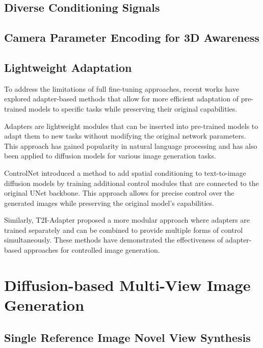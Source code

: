 \subsection{Diverse Conditioning Signals}

\subsection{Camera Parameter Encoding for 3D Awareness}

\subsection{Lightweight Adaptation}

To address the limitations of full fine-tuning approaches, recent
works have explored adapter-based methods that allow for more
efficient adaptation of pre-trained models to specific tasks while
preserving their original capabilities.

Adapters are lightweight modules that can be inserted into
pre-trained models to adapt them to new tasks without modifying the
original network parameters. This approach has gained popularity in
natural language processing and has also been applied to diffusion
models for various image generation tasks.

ControlNet \cite{controlnet} introduced a method to add spatial
conditioning to text-to-image diffusion models by training additional
control modules that are connected to the original UNet backbone.
This approach allows for precise control over the generated images
while preserving the original model's capabilities.

Similarly, T2I-Adapter \cite{t2iadapter} proposed a more modular
approach where adapters are trained separately and can be combined to
provide multiple forms of control simultaneously. These methods have
demonstrated the effectiveness of adapter-based approaches for
controlled image generation.

\section{Diffusion-based Multi-View Image
Generation}\label{sec:multi-view-diffusion}

\subsection{Single Reference Image Novel View Synthesis}

